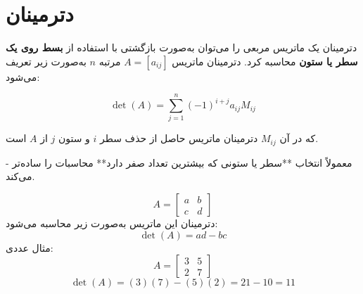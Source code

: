 \section{ دترمینان}
\begin{definition}
	دترمینان یک ماتریس مربعی را می‌توان به‌صورت بازگشتی با استفاده از \textbf{بسط روی یک سطر یا ستون} محاسبه کرد.  
	دترمینان ماتریس \( A = [a_{ij}] \) مرتبه \( n \) به‌صورت زیر تعریف می‌شود:
	
	\[
	\det(A) = \sum_{j=1}^{n} (-1)^{i+j} a_{ij} M_{ij}
	\]
	
	که در آن
 \( M_{ij} \) دترمینان ماتریس حاصل از حذف سطر \( i \) و ستون \( j \) از \( A \) است.
	
\end{definition}
\begin{nokteh}
	- معمولاً انتخاب **سطر یا ستونی که بیشترین تعداد صفر دارد** محاسبات را ساده‌تر می‌کند.
\end{nokteh}
\begin{example}
	
	\[
	A =
	\begin{bmatrix}
		a & b \\
		c & d
	\end{bmatrix}
	\]
	دترمینان این ماتریس به‌صورت زیر محاسبه می‌شود:
	\[
	\det(A) = ad - bc
	\]
	مثال عددی:
	\[
	A =
	\begin{bmatrix}
		3 & 5 \\
		2 & 7
	\end{bmatrix}
	\]
	\[
	\det(A) = (3)(7) - (5)(2) = 21 - 10 = 11
	\]
\end{example}

